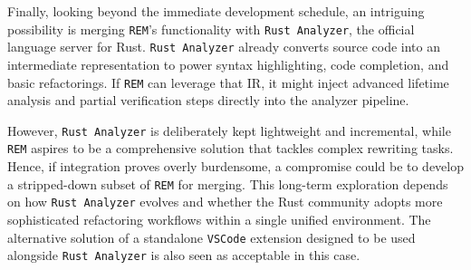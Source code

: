 Finally, looking beyond the immediate development schedule, an intriguing
possibility is merging \texttt{REM}'s functionality with \texttt{Rust Analyzer},
the official language server for Rust. \texttt{Rust Analyzer} already converts
source code into an intermediate representation to power syntax highlighting,
code completion, and basic refactorings. If \texttt{REM} can leverage that IR,
it might inject advanced lifetime analysis and partial verification steps
directly into the analyzer pipeline.

However, \texttt{Rust Analyzer} is deliberately kept lightweight and
incremental, while \texttt{REM} aspires to be a comprehensive solution that
tackles complex rewriting tasks. Hence, if integration proves overly burdensome,
a compromise could be to develop a stripped-down subset of \texttt{REM} for
merging. This long-term exploration depends on how \texttt{Rust Analyzer}
evolves and whether the Rust community adopts more sophisticated refactoring
workflows within a single unified environment. The alternative solution of a
standalone \texttt{VSCode} extension designed to be used alongside \texttt{Rust
Analyzer} is also seen as acceptable in this case.
